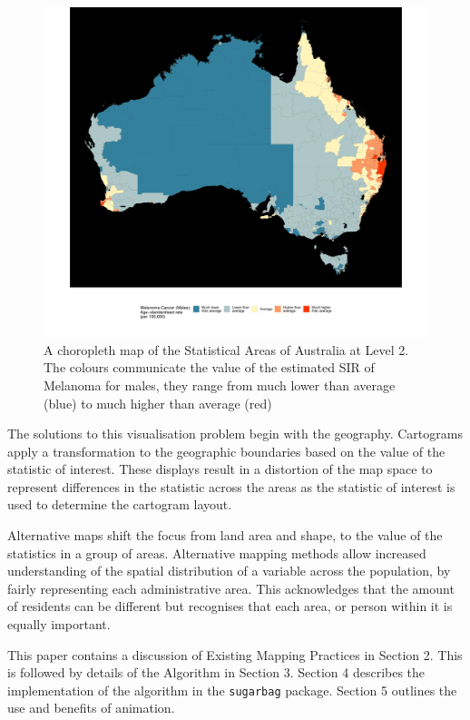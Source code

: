 \documentclass{monashthesis}
\begin{document}
\begin{figure}[H]
\centering
\includegraphics[width=14cm]{figures/03-algorithm/aus_ggchoro.pdf}
\caption{\label{fig:melanoma-geo}A choropleth map of the Statistical Areas of Australia at Level 2. The colours communicate the value of the estimated SIR of Melanoma for males, they range from much lower than average (blue) to much higher than average (red)}
\end{figure}

The solutions to this visualisation problem begin with the geography. Cartograms apply a transformation to the geographic boundaries based on the value of the statistic of interest. These displays result in a distortion of the map space to represent differences in the statistic across the areas \autocite{ACCAC} as the statistic of interest is used to determine the cartogram layout.

Alternative maps shift the focus from land area and shape, to the value of the statistics in a group of areas.
Alternative mapping methods allow increased understanding of the spatial distribution of a variable across the population, by fairly representing each administrative area. This acknowledges that the amount of residents can be different but recognises that each area, or person within it is equally important.

This paper contains a discussion of Existing Mapping Practices in Section 2. This is followed by details of the Algorithm in Section 3. Section 4 describes the implementation of the algorithm in the \texttt{sugarbag} package. Section 5 outlines the use and benefits of animation.
\end{document}
